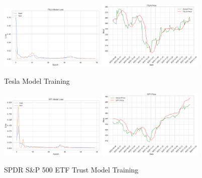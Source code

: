 \documentclass{ledger}
\begin{document}
\begin{figure}[htbp]
    \centering
    \includegraphics[width=0.45\textwidth]{code/price-prediction/lstm/images/tsla_loss.png} %
    \hspace{0.05\textwidth} %
    \includegraphics[width=0.45\textwidth]{code/price-prediction/lstm/images/tsla_price.png} %
    \caption{Tesla Model Training}
    \label{fig:side_by_side}
\end{figure}

\begin{figure}[htbp]
    \centering
    \includegraphics[width=0.45\textwidth]{code/price-prediction/lstm/images/spy_loss.png} %
    \hspace{0.05\textwidth} %
    \includegraphics[width=0.45\textwidth]{code/price-prediction/lstm/images/spy_price.png} %
    \caption{SPDR S\&P 500 ETF Trust Model Training}
    \label{fig:side_by_side}
\end{figure}
\end{document}

